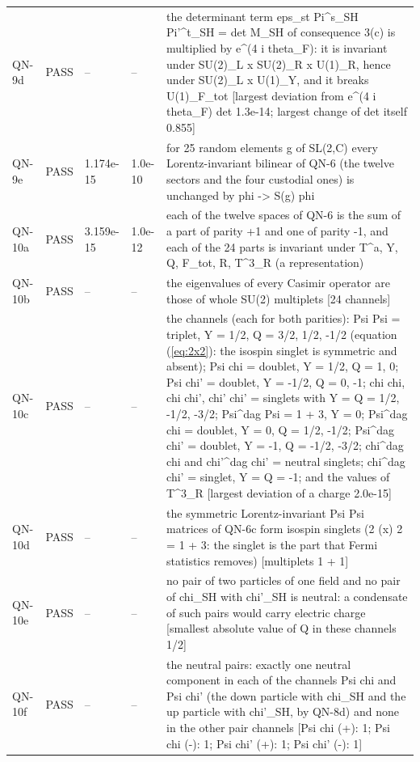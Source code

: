 \documentclass[aps,prd,onecolumn,superscriptaddress,nofootinbib,floatfix,longbibliography]{revtex4-2}
\begin{document}
\begin{longtable}{p{}p{}p{}p{}p{}}
QN-9d & PASS & -- & -- & the determinant term eps\_st Pi\textasciicircum{}s\_SH Pi'\textasciicircum{}t\_SH = det M\_SH of consequence 3(c) is multiplied by e\textasciicircum{}(4 i theta\_F): it is invariant under SU(2)\_L x SU(2)\_R x U(1)\_R, hence under SU(2)\_L x U(1)\_Y, and it breaks U(1)\_F\_tot [largest deviation from e\textasciicircum{}(4 i theta\_F) det 1.3e-14; largest change of det itself 0.855] \\
QN-9e & PASS & 1.174e-15 & 1.0e-10 & for 25 random elements g of SL(2,C) every Lorentz-invariant bilinear of QN-6 (the twelve sectors and the four custodial ones) is unchanged by phi -\textgreater{} S(g) phi \\
QN-10a & PASS & 3.159e-15 & 1.0e-12 & each of the twelve spaces of QN-6 is the sum of a part of parity +1 and one of parity -1, and each of the 24 parts is invariant under T\textasciicircum{}a, Y, Q, F\_tot, R, T\textasciicircum{}3\_R (a representation) \\
QN-10b & PASS & -- & -- & the eigenvalues of every Casimir operator are those of whole SU(2) multiplets [24 channels] \\
QN-10c & PASS & -- & -- & the channels (each for both parities): Psi Psi = triplet, Y = 1/2, Q = 3/2, 1/2, -1/2 (equation (\ref{eq:2x2}): the isospin singlet is symmetric and absent); Psi chi = doublet, Y = 1/2, Q = 1, 0; Psi chi' = doublet, Y = -1/2, Q = 0, -1; chi chi, chi chi', chi' chi' = singlets with Y = Q = 1/2, -1/2, -3/2; Psi\textasciicircum{}dag Psi = 1 + 3, Y = 0; Psi\textasciicircum{}dag chi = doublet, Y = 0, Q = 1/2, -1/2; Psi\textasciicircum{}dag chi' = doublet, Y = -1, Q = -1/2, -3/2; chi\textasciicircum{}dag chi and chi'\textasciicircum{}dag chi' = neutral singlets; chi\textasciicircum{}dag chi' = singlet, Y = Q = -1; and the values of T\textasciicircum{}3\_R [largest deviation of a charge 2.0e-15] \\
QN-10d & PASS & -- & -- & the symmetric Lorentz-invariant Psi Psi matrices of QN-6c form isospin singlets (2 (x) 2 = 1 + 3: the singlet is the part that Fermi statistics removes) [multiplets 1 + 1] \\
QN-10e & PASS & -- & -- & no pair of two particles of one field and no pair of chi\_SH with chi'\_SH is neutral: a condensate of such pairs would carry electric charge [smallest absolute value of Q in these channels 1/2] \\
QN-10f & PASS & -- & -- & the neutral pairs: exactly one neutral component in each of the channels Psi chi and Psi chi' (the down particle with chi\_SH and the up particle with chi'\_SH, by QN-8d) and none in the other pair channels [Psi chi (+): 1; Psi chi (-): 1; Psi chi' (+): 1; Psi chi' (-): 1] \\

\end{longtable}
\end{document}
